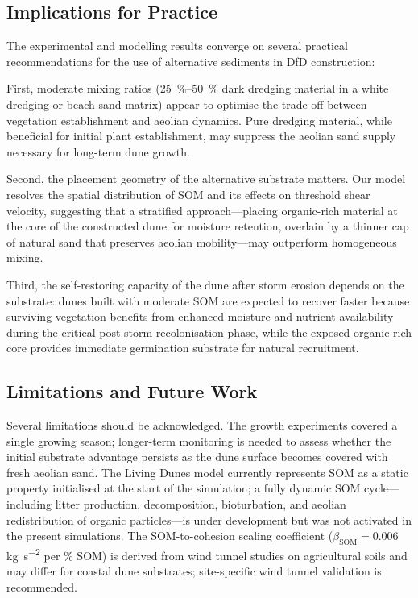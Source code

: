 \documentclass[authoryear,preprint,review,12pt]{elsarticle}
\newcommand{\SOM}{\mathrm{SOM}}
\begin{document}
\subsection{Implications for Practice}

The experimental and modelling results converge on several practical recommendations for the use of alternative sediments in DfD construction:

First, moderate mixing ratios (\SIrange{25}{50}{\percent} dark dredging material in a white dredging or beach sand matrix) appear to optimise the trade-off between vegetation establishment and aeolian dynamics. Pure dredging material, while beneficial for initial plant establishment, may suppress the aeolian sand supply necessary for long-term dune growth.

Second, the placement geometry of the alternative substrate matters. Our model resolves the spatial distribution of SOM and its effects on threshold shear velocity, suggesting that a stratified approach---placing organic-rich material at the core of the constructed dune for moisture retention, overlain by a thinner cap of natural sand that preserves aeolian mobility---may outperform homogeneous mixing.

Third, the self-restoring capacity of the dune after storm erosion depends on the substrate: dunes built with moderate SOM are expected to recover faster because surviving vegetation benefits from enhanced moisture and nutrient availability during the critical post-storm recolonisation phase, while the exposed organic-rich core provides immediate germination substrate for natural recruitment.

\subsection{Limitations and Future Work}

Several limitations should be acknowledged. The growth experiments covered a single growing season; longer-term monitoring is needed to assess whether the initial substrate advantage persists as the dune surface becomes covered with fresh aeolian sand. The Living Dunes model currently represents SOM as a static property initialised at the start of the simulation; a fully dynamic SOM cycle---including litter production, decomposition, bioturbation, and aeolian redistribution of organic particles---is under development but was not activated in the present simulations. The SOM-to-cohesion scaling coefficient ($\beta_{\SOM} = 0.006$ \si{\kilo\gram\per\second\squared} per \% SOM) is derived from wind tunnel studies on agricultural soils \citep{zobeck2013soil} and may differ for coastal dune substrates; site-specific wind tunnel validation is recommended.
\end{document}
